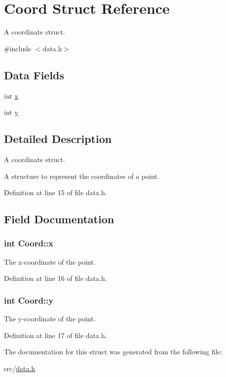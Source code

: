 \hypertarget{struct_coord}{\section{Coord Struct Reference}
\label{struct_coord}
}


A coordinate struct.  




{\ttfamily \#include $<$data.\+h$>$}

\subsection*{Data Fields}
\begin{DoxyCompactItemize}
\item 
int \hyperlink{struct_coord_a696eaa744360fc791d0e3b331c549dbe}{x}
\item 
int \hyperlink{struct_coord_a214166cca70cef7dda9201689c3e81ab}{y}
\end{DoxyCompactItemize}


\subsection{Detailed Description}
A coordinate struct. 

A structure to represent the coordinates of a point. 

Definition at line 15 of file data.\+h.



\subsection{Field Documentation}
\hypertarget{struct_coord_a696eaa744360fc791d0e3b331c549dbe}{
\subsubsection[{x}]{\setlength{\rightskip}{0pt plus 5cm}int Coord\+::x}}\label{struct_coord_a696eaa744360fc791d0e3b331c549dbe}
The x-\/coordinate of the point. 

Definition at line 16 of file data.\+h.

\hypertarget{struct_coord_a214166cca70cef7dda9201689c3e81ab}{
\subsubsection[{y}]{\setlength{\rightskip}{0pt plus 5cm}int Coord\+::y}}\label{struct_coord_a214166cca70cef7dda9201689c3e81ab}
The y-\/coordinate of the point. 

Definition at line 17 of file data.\+h.



The documentation for this struct was generated from the following file\+:\begin{DoxyCompactItemize}
\item 
src/\hyperlink{data_8h}{data.\+h}\end{DoxyCompactItemize}
